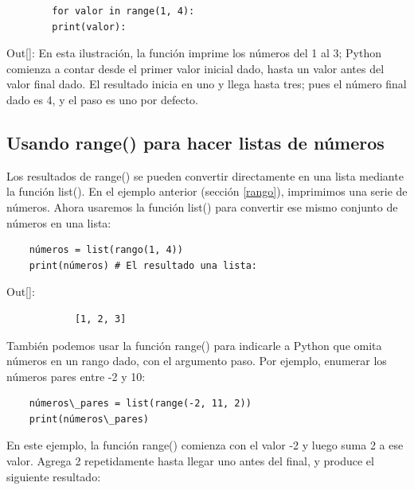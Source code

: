 \hspace{-2.5cm}{\ttfamily \scriptsize rango01.py}
{\vspace{-0.5cm}
	\begin{lstlisting}
		for valor in range(1, 4):
		print(valor):
\end{lstlisting}}

{\ttfamily\scriptsize\scriptsize\noindent Out[]:
}\vspace{-0.1cm}
\noindent En esta ilustración, la función  imprime los números del 1 al 3;  Python comienza a contar desde el primer valor inicial dado,  hasta un valor antes del valor final dado.  El resultado inicia en uno y llega hasta tres; pues el número final dado es 4, y el paso es uno por defecto.


\subsection{Usando range() para hacer listas de números}

Los resultados de {\ttfamily range()} se pueden convertir directamente en una lista mediante la función  {\ttfamily list()}.  En el ejemplo anterior (sección \ref{rango}),  imprimimos una serie de
números. Ahora  usaremos la función  {\ttfamily list()} para convertir ese mismo conjunto de números en una lista:

\hspace{-2.4cm}{\ttfamily \scriptsize rango02.py}  \vspace{-0.53cm}
\begin{lstlisting}
	números = list(rango(1, 4))
	print(números) # El resultado una lista:
\end{lstlisting}

{\ttfamily\scriptsize\scriptsize\noindent Out[]: \vspace{-0.3cm}	%
	{\color{blue} 	
		\begin{verbatim}
			[1, 2, 3]
		\end{verbatim}
}}


También podemos usar la función  {\ttfamily range()} para indicarle a Python que omita números en un
rango dado, con el argumento paso. Por ejemplo, enumerar los números pares entre -2 y 10:

\hspace{-2.2cm}{\ttfamily \scriptsize pares.py}  \vspace{-0.52cm}
\begin{lstlisting}
	números\_pares = list(range(-2, 11, 2))
	print(números\_pares) 
\end{lstlisting}	
En este ejemplo, la función {\ttfamily range()} comienza con el valor -2 y luego
suma 2 a ese valor. Agrega 2 repetidamente hasta llegar uno antes del final, y produce el siguiente resultado:

